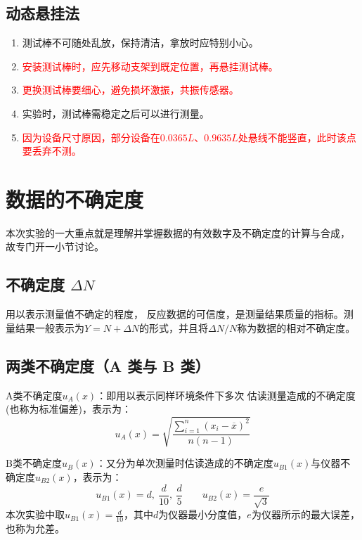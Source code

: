 \documentclass[11pt]{article}
\begin{document}
	
	\subsection{动态悬挂法}
	\begin{enumerate}
		\item 测试棒不可随处乱放，保持清洁，拿放时应特别小心。
		\item \textcolor{red}{安装测试棒时，应先移动支架到既定位置，再悬挂测试棒。}
		\item \textcolor{red}{更换测试棒要细心，避免损坏激振，共振传感器。}
		\item 实验时，测试棒需稳定之后可以进行测量。
		\item \textcolor{red}{因为设备尺寸原因，部分设备在$0.0365L$、$ 0.9635L$处悬线不能竖直，此时该点要丢弃不测。}
	\end{enumerate}
	
	\section{数据的不确定度}
	
	本次实验的一大重点就是理解并掌握数据的有效数字及不确定度的计算与合成，
	故专门开一小节讨论。
	
	\subsection{不确定度 $\Delta N$}
	
	用以表示测量值不确定的程度，
	反应数据的可信度，是测量结果质量的指标。测量结果一般表示为$Y=N+\Delta N$的形式，并且将$\Delta N/N$称为数据的相对不确定度。
	
	\subsection{两类不确定度（A 类与 B 类）}
	
	
	A类不确定度$u_A(x)$：即用以表示同样环境条件下多次
	估读测量造成的不确定度(也称为标准偏差)，表示为：
	\begin{equation*}
		u_A(x)=\sqrt{\frac{\sum_{i=1}^n(x_i-\overline x)^2}{n(n-1)}}
	\end{equation*}
	
	B类不确定度$u_B(x)$：又分为单次测量时估读造成的不确定度$u_{B1}(x)$与仪器不确定度$u_{B2}(x)$，表示为：
	\begin{equation*}
		u_{B1}(x)=d,\ \frac{d}{10},\ \frac{d}{5}\qquad u_{B2}(x)=\frac{e}{\sqrt 3} 
	\end{equation*}
	本次实验中取$u_{B1}(x)=\frac{d}{10}$，其中$d$为仪器最小分度值，$e$为仪器所示的最大误差，也称为允差。
	
\end{document}
